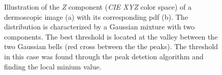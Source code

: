 
\begin{figure}
	\centering
	\hspace*{\fill}
	\hfill
	\hspace*{\fill}
	\caption[\acl{pdf}-based segmentation]{Illustration of the \textit{Z} component (\textit{CIE XYZ} color space) of a dermoscopic image (a) with its corresponding \ac{pdf} (b). The distribution is characterized by a Gaussian mixture with two components. The best threshold is located at the valley between the two Gaussian bells (red cross between the the peaks).
The threshold in this case was found through the peak detetion algorithm and finding the local minium value.}
	\label{fig:pdfseg}
\end{figure}
